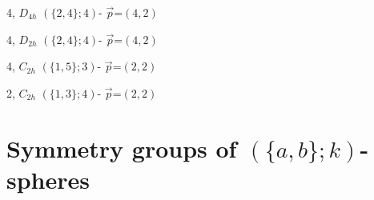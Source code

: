 \documentclass{beamer}
\begin{document}
\begin{frame}
\begin{itemize}
\end{itemize}
\small
\begin{center}
\begin{minipage}[b]{19mm}
\centering
{}\par
4, $D_{4h}$ 
$(\{2, 4\};4)$-
$\vec{p}$=$(4,2)$
\end{minipage}
\begin{minipage}[b]{20mm}
\centering
{}\par
4, $D_{2h}$ 
$(\{2, 4\};4)$-
$\vec{p}$=$(4,2)$
\end{minipage}
\hspace{1mm}
\begin{minipage}[b]{19mm}\centering
{}\par
4, $C_{2h}$
$(\{1, 5\};3)$-
$\vec{p}$=$(2,2)$
\end{minipage}
\hspace{8mm}
\begin{minipage}[b]{19mm}\centering
{}\par
2, $C_{2h}$
$(\{1, 3\};4)$-
$\vec{p}$=$(2,2)$
\end{minipage}
\end{center}


\end{frame}  

\section[]{Symmetry groups of $(\{a,b\};k)$-spheres}

\end{document}
